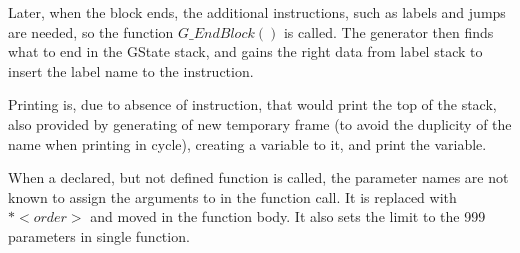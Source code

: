 \documentclass[12pt,a4paper,titlepage]{report}
\begin{document}
\begin{justify}
Later, when the block ends, the additional instructions, such as labels and
jumps are needed, so the function $G\_EndBlock()$ is called. The generator then
finds what to end in the GState stack, and gains the right data from label stack
to insert the label name to the instruction.
\end{justify}

\begin{justify}
Printing is, due to absence of instruction, that would print the top of the
stack, also provided by generating of new temporary frame (to avoid the
duplicity of the name when printing in cycle), creating a variable to it,
and print the variable.
\end{justify}

\begin{justify}
When a declared, but not defined function is called, the parameter names are not
known to assign the arguments to in the function call. It is replaced with
$*<order>$ and moved in the function body. It also sets the limit to the 999
parameters in single function.
\end{justify}
\end{document}

